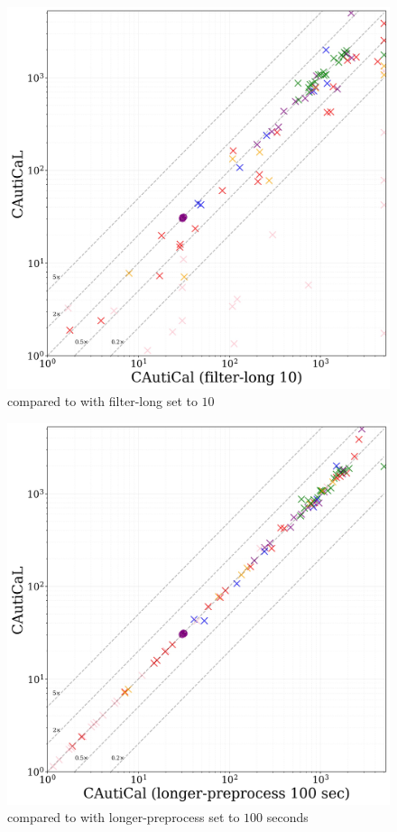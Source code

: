 \hfill
\begin{subfigure}[t]{0.3\textwidth}
    \centering
    \includegraphics[width=\textwidth]{figs/globalmaxlen_heuristic_comparison.jpg}
    \caption{\tool compared to \tool with \textsf{filter-long} set to $10$}
    \label{fig:global-max-length}
\end{subfigure} 
\hfill
\begin{subfigure}[t]{0.3\textwidth}
    \centering
    \includegraphics[width=\textwidth]{figs/global_time_lim_heuristic_comparison.jpg}
    \caption{\tool compared to \tool with \textsf{longer-preprocess} set to $100$ seconds}
    \label{fig:global-time-limit}
\end{subfigure}
